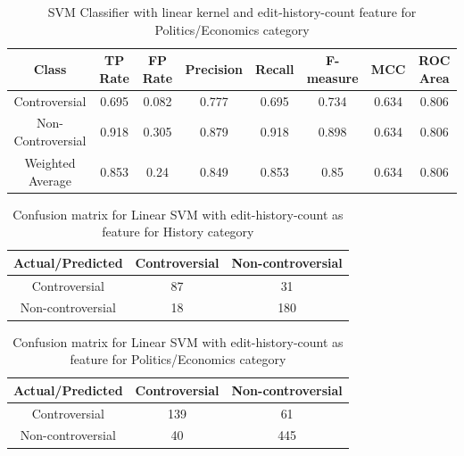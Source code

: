 \documentclass[twocolumn]{article}
\begin{document}
 \begin{table}[ht]
	{ 	\centering
		\hfill{}
 	\begin{tabular}{|c|c|c|c|c|c|c|c|}
 		\hline
 		\textbf{Class} & \textbf{TP Rate} & \textbf{FP Rate} & \textbf{Precision} & \textbf{Recall} & \textbf{F-measure} & \textbf{MCC} & \textbf{ROC Area} \\
 		\hline
 		\hline
 		Controversial & 0.695 & 0.082 & 0.777 & 0.695 & 0.734 & 0.634 & 0.806 \\
 		Non-Controversial & 0.918 & 0.305 & 0.879 & 0.918 & 0.898 & 0.634 & 0.806\\
 		Weighted Average & 0.853 & 0.24 & 0.849 & 0.853 & 0.85 & 0.634 & 0.806 \\
 		\hline
 	\end{tabular}}
 	\hfill{}
 	\centering
 	\caption{SVM Classifier with linear kernel and edit-history-count feature for Politics/Economics category}
 	\label{tab:2}
 \end{table}
 \begin{table}[History]
 	\centering
 	\begin{tabular}{|c|c|c|}
 		\hline
 		\textbf{Actual/Predicted} & Controversial &Non-controversial \\
 		\hline
 		Controversial & 87 & 31\\
 		Non-controversial & 18 & 180\\
 		\hline
 	\end{tabular}
 	\caption{Confusion matrix for Linear SVM with edit-history-count as feature for History category}
 	\label{tab:3}
 \end{table} 
  
 \begin{table}[Politics/Economics]
 	\centering
 	\begin{tabular}{|c|c|c|}
 		\hline
 		\textbf{Actual/Predicted} & Controversial &Non-controversial \\
 		\hline
 		Controversial & 139 & 61\\
 		Non-controversial & 40 & 445\\
 		\hline
 	\end{tabular}
 	\caption{Confusion matrix for Linear SVM with edit-history-count as feature for Politics/Economics category}
 	\label{tab:4}
 \end{table}
 
\end{document}
